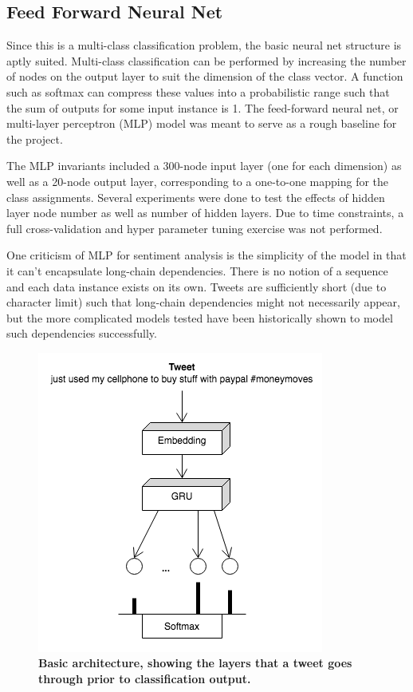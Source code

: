 \documentclass[11pt,a4paper]{article}
\begin{document}
	\subsection{Feed Forward Neural Net}
	Since this is a multi-class classification problem, the basic neural net structure is aptly suited. Multi-class classification can be performed by increasing the number of nodes on the output layer to suit the dimension of the class vector. A function such as softmax can compress these values into a probabilistic range such that the sum of outputs for some input instance is 1. The feed-forward neural net, or multi-layer perceptron (MLP) model was meant to serve as a rough baseline for the project.
	\par
	The MLP invariants included a 300-node input layer (one for each dimension) as well as a 20-node output layer, corresponding to a one-to-one mapping for the class assignments. Several experiments were done to test the effects of hidden layer node number as well as number of hidden layers. Due to time constraints, a full cross-validation and hyper parameter tuning exercise was not performed. 
	\par
	One criticism of MLP for sentiment analysis is the simplicity of the model in that it can’t encapsulate long-chain dependencies. There is no notion of a sequence and each data instance exists on its own. Tweets are sufficiently short (due to character limit) such that long-chain dependencies might not necessarily appear, but the more complicated models tested have been historically shown to model such dependencies successfully. 
	
	\begin{figure}[H]
		\centering\includegraphics[scale=0.7]{modelgru} 
		\caption{\textbf{ Basic architecture, showing the layers that a tweet goes through prior to classification output.}}
	\end{figure}
	
\end{document}
